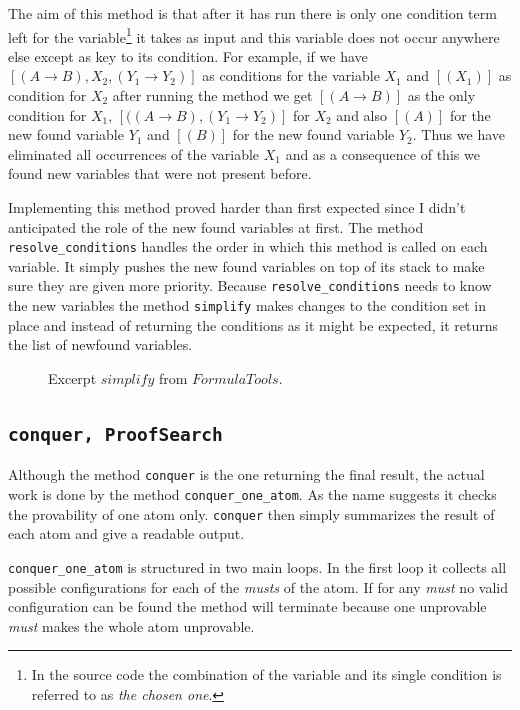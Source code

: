 The aim of this method is that after it has run there is only one condition term left for the variable\footnote{In the source code the combination of the variable and its single condition is referred to as \emph{the chosen one}.} it takes as input and this variable does not occur anywhere else except as key to its condition. For example, if we have $ [(A \rightarrow B), X_2, (Y_1 \rightarrow Y_2)]$ as conditions for the variable $X_1$ and $[(X_1)]$ as condition for $X_2$ after running the method we get $[(A \rightarrow B)]$ as the only condition for $X_1$, $[((A \rightarrow B), (Y_1 \rightarrow Y_2)]$ for $X_2$ and also $[(A)]$ for the new found variable $Y_1$ and $[(B)]$ for the new found variable $Y_2$. Thus we have eliminated all occurrences of the variable $X_1$ and as a consequence of this we found new variables that were not present before. 

Implementing this method proved harder than first expected since I didn't anticipated the role of the new found variables at first. The method \texttt{resolve\_conditions} handles the order in which this method is called on each variable. It simply pushes the new found variables on top of its stack to make sure they are given more priority. Because \texttt{resolve\_conditions} needs to know the new variables the method \texttt{simplify} makes changes to the condition set in place and instead of returning the conditions as it might be expected, it returns the list of newfound variables.

\begin{figure}[H]
	\caption{Excerpt $simplify$ from $FormulaTools$.}
	\vspace{-10pt}
	
	\vspace{-10pt}
\end{figure}


\subsection[conquer]{\texttt{conquer, ProofSearch}}
Although the method \texttt{conquer} is the one returning the final result, the actual work is done by the method \texttt{conquer\_one\_atom}. As the name suggests it checks the provability of one atom only. \texttt{conquer} then simply summarizes the result of each atom and give a readable output.

\texttt{conquer\_one\_atom} is structured in two main loops. In the first loop it collects all possible configurations for each of the \emph{musts} of the atom. If for any \emph{must} no valid configuration can be found the method will terminate because one unprovable \emph{must} makes the whole atom unprovable.

